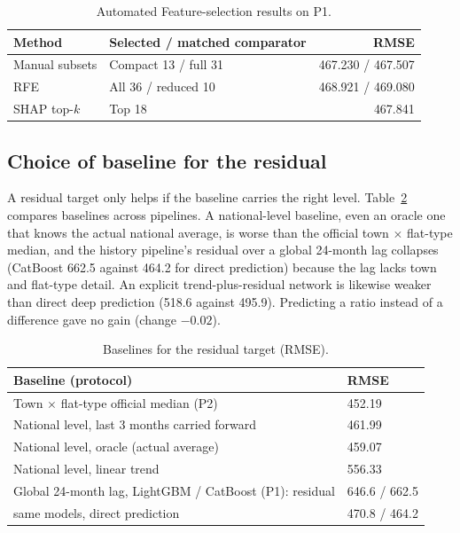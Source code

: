 \documentclass[conference]{IEEEtran}
\newif\ifshowsrc
\newcommand{\src}[1]{\ifshowsrc\textsuperscript{\tiny\color{gray}[#1]}\fi}
\begin{document}
\begin{table}[t]
\caption{Automated Feature-selection results on P1.\src{Me-fs-manual,Me-fs-auto}}\label{tab:feature-selection}
\centering\footnotesize
\begin{tabular}{@{}p{2.0cm}p{3.9cm}r@{}}
\toprule
Method & Selected / matched comparator & RMSE\\
\midrule
Manual subsets & Compact 13 / full 31 & 467.230 / 467.507\\
RFE & All 36 / reduced 10 & 468.921 / 469.080\\
SHAP top-$k$ & Top 18 & 467.841\\
\bottomrule
\end{tabular}
\end{table}

\subsection{Choice of baseline for the residual}
A residual target only helps if the baseline carries the right level. Table~\ref{tab:base} compares baselines across pipelines. A national-level baseline, even an oracle one that knows the actual national average, is worse than the official town $\times$ flat-type median,\src{Be-two-stage} and the history pipeline's residual over a global 24-month lag collapses (CatBoost 662.5 against 464.2 for direct prediction) because the lag lacks town and flat-type detail.\src{Pu-lagres} An explicit trend-plus-residual network is likewise weaker than direct deep prediction (518.6 against 495.9).\src{Me-trendres} Predicting a ratio instead of a difference gave no gain (change $-0.02$).\src{Be-impr}

\begin{table}[t]
\caption{Baselines for the residual target (RMSE).\src{Be-two-stage,Pu-lagres}}\label{tab:base}
\centering\footnotesize
\begin{tabular}{@{}p{4.6cm}p{2.9cm}@{}}
\toprule
Baseline (protocol) & RMSE\\
\midrule
Town $\times$ flat-type official median (P2) & 452.19\\
National level, last 3 months carried forward & 461.99\\
National level, oracle (actual average) & 459.07\\
National level, linear trend & 556.33\\
\midrule
Global 24-month lag, LightGBM / CatBoost (P1): residual & 646.6 / 662.5\\
\hspace{1.2em}same models, direct prediction & 470.8 / 464.2\\
\bottomrule
\end{tabular}
\end{table}
\end{document}
